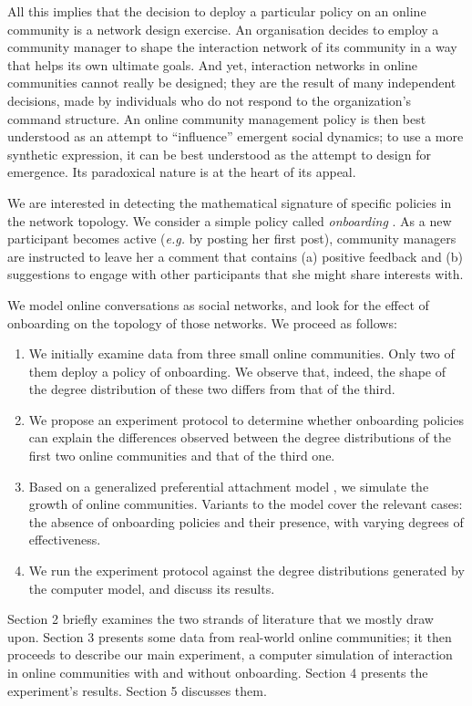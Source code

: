 \documentclass{bmcart}
\begin{document}
All this implies that the decision to deploy a particular policy on an online community is a network design exercise. An organisation decides to employ a community manager to shape the interaction network of its community in a way that helps its own ultimate goals. 
And yet, interaction networks in online communities cannot really be designed; they are the result of many independent decisions, made by individuals who do not respond to the organization's command structure. An online community management policy is then best understood as an attempt to ``influence'' emergent social dynamics; to use a more synthetic expression, it can be best understood as the attempt to design for emergence. Its paradoxical nature is at the heart of its appeal. 

We are interested in detecting the mathematical signature of specific policies in the network topology. 
We consider a simple policy called \emph{onboarding} \cite{rheingold1993virtual} \cite{shirky2008here}. As a new participant becomes active (\emph{e.g.} by posting her first post), community managers are instructed to leave her a comment that contains (a) positive feedback and (b) suggestions to engage with other participants that she might share interests with.

We model online conversations as social networks, and look for the effect of onboarding on the topology of those networks. We proceed as follows:
\begin{enumerate}
\item We initially examine data from three small online communities. Only two of them deploy a policy of onboarding. We observe that, indeed, the shape of the degree distribution of these two differs from that of the third.  
\item We propose an experiment protocol to determine whether onboarding policies can explain the differences observed between the degree distributions of the first two online communities and that of the third one. 
\item Based on a generalized preferential attachment model \cite{dorogovtsev2002evolution}, we simulate the growth of online communities. Variants to the model cover the relevant cases: the absence of onboarding policies and their presence, with varying degrees of effectiveness. 
\item We run the experiment protocol against the degree distributions generated by the computer model, and discuss its results.
\end{enumerate}
Section 2 briefly examines the two strands of literature that we mostly draw upon. Section 3 presents some data from real-world online communities; it then proceeds to describe our main experiment, a computer simulation of interaction in online communities with and without onboarding. Section 4 presents the experiment's results. Section 5 discusses them.
\end{document}
